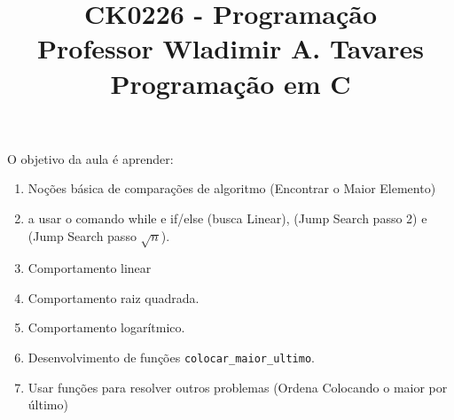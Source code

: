 \documentclass[a4paper,11pt]{article}
\begin{document}
\title{CK0226 - Programação \\
Professor Wladimir A. Tavares\\
Programação em C}
\date{}
\maketitle

\normalsize

\noindent

O objetivo da aula é aprender:

\begin{enumerate}
    \item Noções básica de comparações de algoritmo (Encontrar o Maior Elemento)
    \item a usar o comando while e if/else (busca Linear), (Jump Search passo 2) e  (Jump Search passo $\sqrt{n}$).
    \item Comportamento linear
    \item Comportamento raiz quadrada.
    \item Comportamento logarítmico.
    \item Desenvolvimento de funções \texttt{colocar\_maior\_ultimo}.
    \item Usar funções para resolver outros problemas (Ordena Colocando o maior por último)
\end{enumerate}

\newpage 




    
\end{document}
